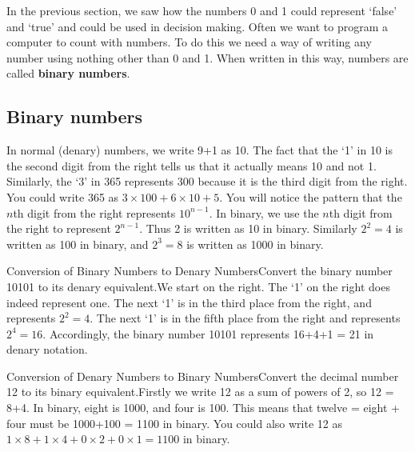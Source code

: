 In the previous section, we saw how the numbers 0 and 1 could represent `false' and `true' and could be used in decision making.  Often we want to program a computer to count with numbers.  To do this we need a way of writing any number using nothing other than 0 and 1.  When written in this way, numbers are called {\bf binary numbers}.


\subsection{Binary numbers}

In normal (denary) numbers, we write 9+1 as 10.  The fact that the `1' in 10 is the second digit from the right tells us that it actually means 10 and not 1.  Similarly, the `3' in 365 represents 300 because it is the third digit from the right.  You could write 365 as $3 \times 100 + 6 \times 10 + 5$.  You will notice the pattern that the $n$th digit from the right represents $10^{n-1}$.  In binary, we use the $n$th digit from the right to represent $2^{n-1}$.  Thus 2 is written as 10 in binary.  Similarly $2^{2} = 4$ is written as 100 in binary, and $2^{3} = 8$ is written as 1000 in binary.

\clearpage

\begin{wex}{Conversion of Binary Numbers to Denary Numbers}{Convert the binary number 10101 to its denary equivalent.}{We start on the right.  The `1' on the right does indeed represent one.  The next `1' is in the third place from the right, and represents $2^2 = 4$.  The next `1' is in the fifth place from the right and represents $2^4 = 16$.  Accordingly, the binary number 10101 represents 16+4+1 = 21 in denary notation.}
\end{wex}


\begin{wex}{Conversion of Denary Numbers to Binary Numbers}{Convert the decimal number 12 to its binary equivalent.}{Firstly we write 12 as a sum of powers of 2, so 12 = 8+4.  In binary, eight is 1000, and four is 100.  This means that twelve = eight + four must be 1000+100 = 1100 in binary.  You could also write 12 as $1 \times 8 + 1 \times 4 + 0 \times 2 + 0 \times 1 = 1100$ in binary.}
\end{wex}

